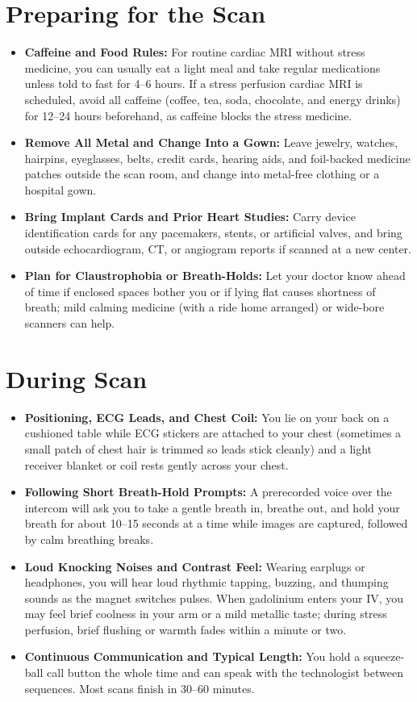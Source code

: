 \section{Preparing for the Scan}
\begin{itemize}
\item \textbf{Caffeine and Food Rules:} For routine cardiac MRI without stress medicine, you can usually eat a light meal and take regular medications unless told to fast for 4--6 hours. If a stress perfusion cardiac MRI is scheduled, avoid all caffeine (coffee, tea, soda, chocolate, and energy drinks) for 12--24 hours beforehand, as caffeine blocks the stress medicine.
\item \textbf{Remove All Metal and Change Into a Gown:} Leave jewelry, watches, hairpins, eyeglasses, belts, credit cards, hearing aids, and foil-backed medicine patches outside the scan room, and change into metal-free clothing or a hospital gown.
\item \textbf{Bring Implant Cards and Prior Heart Studies:} Carry device identification cards for any pacemakers, stents, or artificial valves, and bring outside echocardiogram, CT, or angiogram reports if scanned at a new center.
\item \textbf{Plan for Claustrophobia or Breath-Holds:} Let your doctor know ahead of time if enclosed spaces bother you or if lying flat causes shortness of breath; mild calming medicine (with a ride home arranged) or wide-bore scanners can help.
\end{itemize}

\section{During Scan}
\begin{itemize}
\item \textbf{Positioning, ECG Leads, and Chest Coil:} You lie on your back on a cushioned table while ECG stickers are attached to your chest (sometimes a small patch of chest hair is trimmed so leads stick cleanly) and a light receiver blanket or coil rests gently across your chest.
\item \textbf{Following Short Breath-Hold Prompts:} A prerecorded voice over the intercom will ask you to take a gentle breath in, breathe out, and hold your breath for about 10--15 seconds at a time while images are captured, followed by calm breathing breaks.
\item \textbf{Loud Knocking Noises and Contrast Feel:} Wearing earplugs or headphones, you will hear loud rhythmic tapping, buzzing, and thumping sounds as the magnet switches pulses. When gadolinium enters your IV, you may feel brief coolness in your arm or a mild metallic taste; during stress perfusion, brief flushing or warmth fades within a minute or two.
\item \textbf{Continuous Communication and Typical Length:} You hold a squeeze-ball call button the whole time and can speak with the technologist between sequences. Most scans finish in 30--60 minutes.
\end{itemize}

